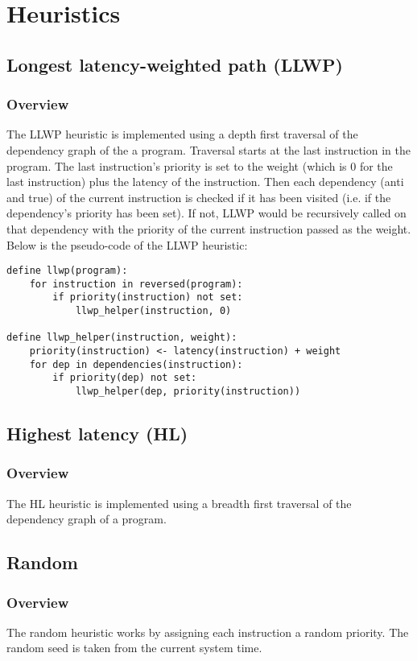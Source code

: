 \documentclass{article}
\begin{document}
\section{Heuristics}
\subsection{Longest latency-weighted path (LLWP)}
\subsubsection{Overview}
The LLWP heuristic is implemented using a depth first traversal of the dependency graph of the a program. Traversal starts at the last instruction in the program. The last instruction's priority is set to the weight (which is 0 for the last instruction) plus the latency of the instruction. Then each dependency (anti and true) of the current instruction is checked if it has been visited (i.e. if the dependency's priority has been set). If not, LLWP would be recursively called on that dependency with the priority of the current instruction passed as the weight. Below is the pseudo-code of the LLWP heuristic:
\begin{verbatim}
define llwp(program):
    for instruction in reversed(program):
        if priority(instruction) not set:
            llwp_helper(instruction, 0)
    
define llwp_helper(instruction, weight):
    priority(instruction) <- latency(instruction) + weight
    for dep in dependencies(instruction):
        if priority(dep) not set:
            llwp_helper(dep, priority(instruction))
\end{verbatim}
\subsection{Highest latency (HL)}
\subsubsection{Overview}
The HL heuristic is implemented using a breadth first traversal of the dependency graph of a program. 
\subsection{Random}
\subsubsection{Overview}
The random heuristic works by assigning each instruction a random priority. The random seed is taken from the current system time.
\end{document}

